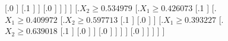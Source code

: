 \documentclass[a4paper]{article}
\theoremstyle{definition}
\newenvironment{soln}{
    \leavevmode\color{blue}\ignorespaces
}{}
\begin{document}
\begin{enumerate}
\begin{itemize}
\begin{soln}
\begin{figure}
{                                    [.0 ]
                                    [.1 ]
                                ]
                                [.0 ]
                            ]
                        ]
                    ]
                    [.{$X_2 \geq 0.534979$}
                        [.{$X_1 \geq 0.426073$}
                            [.1 ]
                            [.{$X_1 \geq 0.409972$}
                                [.{$X_2 \geq 0.597713$}
                                    [.1 ]
                                    [.0 ]
                                ]
                                [.{$X_1 \geq 0.393227$}
                                    [.{$X_2 \geq 0.639018$}
                                        [.1 ]
                                        [.0 ]
                                    ]
                                    [.0 ]
                                ]
                            ]
                        ]
                        [.0 ]
                    ]
                ]
            ]
    ]
    }
    \end{figure}
    \end{soln}
  

\end{itemize}
\end{enumerate}
\end{document}
